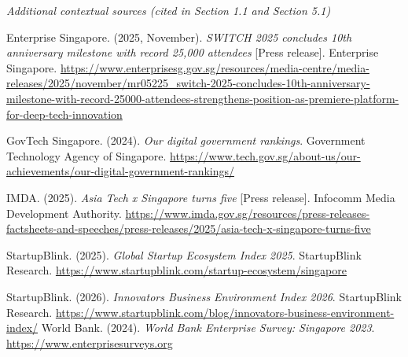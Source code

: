 \documentclass[12pt,a4paper]{article}
\begin{document}
\emph{Additional contextual sources (cited in Section 1.1 and Section
5.1)}

Enterprise Singapore. (2025, November). \emph{SWITCH 2025 concludes 10th
anniversary milestone with record 25,000 attendees} {[}Press release{]}.
Enterprise Singapore.
\url{https://www.enterprisesg.gov.sg/resources/media-centre/media-releases/2025/november/mr05225_switch-2025-concludes-10th-anniversary-milestone-with-record-25000-attendees-strengthens-position-as-premiere-platform-for-deep-tech-innovation}

GovTech Singapore. (2024). \emph{Our digital government rankings}.
Government Technology Agency of Singapore.
\url{https://www.tech.gov.sg/about-us/our-achievements/our-digital-government-rankings/}

IMDA. (2025). \emph{Asia Tech x Singapore turns five} {[}Press
release{]}. Infocomm Media Development Authority.
\url{https://www.imda.gov.sg/resources/press-releases-factsheets-and-speeches/press-releases/2025/asia-tech-x-singapore-turns-five}

StartupBlink. (2025). \emph{Global Startup Ecosystem Index 2025}.
StartupBlink Research.
\url{https://www.startupblink.com/startup-ecosystem/singapore}

StartupBlink. (2026). \emph{Innovators Business Environment Index 2026}.
StartupBlink Research.
\url{https://www.startupblink.com/blog/innovators-business-environment-index/}
World Bank. (2024). \emph{World Bank Enterprise Survey: Singapore 2023}.
\url{https://www.enterprisesurveys.org}
\end{document}
